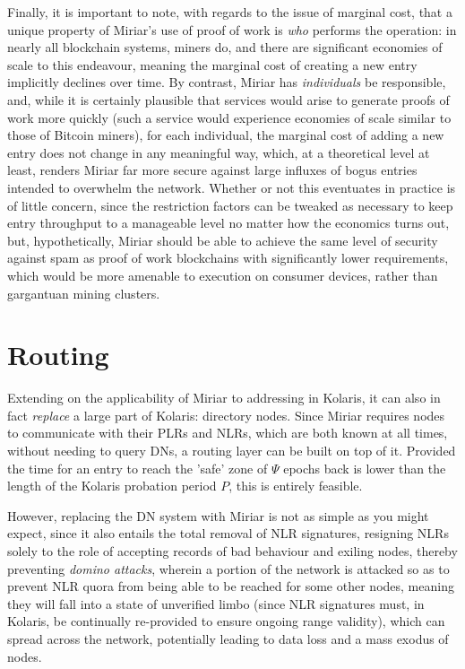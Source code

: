 \documentclass{extreport}
\begin{document}
Finally, it is important to note, with regards to the issue of marginal cost, that a unique property of Miriar's use of proof of work is \emph{who} performs the operation: in nearly all blockchain systems, miners do, and there are significant economies of scale to this endeavour, meaning the marginal cost of creating a new entry implicitly declines over time. By contrast, Miriar has \emph{individuals} be responsible, and, while it is certainly plausible that services would arise to generate proofs of work more quickly (such a service would experience economies of scale similar to those of Bitcoin miners), for each individual, the marginal cost of adding a new entry does not change in any meaningful way, which, at a theoretical level at least, renders Miriar far more secure against large influxes of bogus entries intended to overwhelm the network. Whether or not this eventuates in practice is of little concern, since the restriction factors can be tweaked as necessary to keep entry throughput to a manageable level no matter how the economics turns out, but, hypothetically, Miriar should be able to achieve the same level of security against spam as proof of work blockchains with significantly lower requirements, which would be more amenable to execution on consumer devices, rather than gargantuan mining clusters.

\chapter{Routing}
\label{sec:org28e611f}

Extending on the applicability of Miriar to addressing in Kolaris, it can also in fact \emph{replace} a large part of Kolaris: directory nodes. Since Miriar requires nodes to communicate with their PLRs and NLRs, which are both known at all times, without needing to query DNs, a routing layer can be built on top of it. Provided the time for an entry to reach the 'safe' zone of \(\Psi\) epochs back is lower than the length of the Kolaris probation period \(P\), this is entirely feasible.

However, replacing the DN system with Miriar is not as simple as you might expect, since it also entails the total removal of NLR signatures, resigning NLRs solely to the role of accepting records of bad behaviour and exiling nodes, thereby preventing \emph{domino attacks}, wherein a portion of the network is attacked so as to prevent NLR quora from being able to be reached for some other nodes, meaning they will fall into a state of unverified limbo (since NLR signatures must, in Kolaris, be continually re-provided to ensure ongoing range validity), which can spread across the network, potentially leading to data loss and a mass exodus of nodes.
\end{document}
